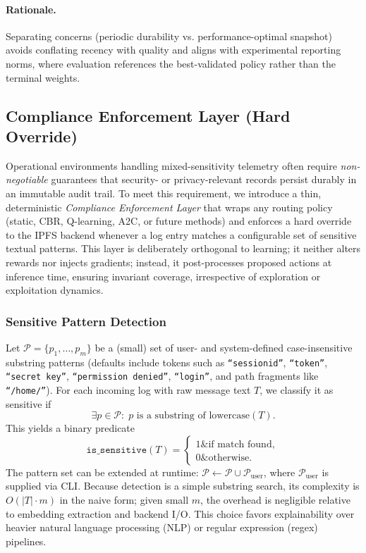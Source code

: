 \paragraph{Rationale.}
Separating concerns (periodic durability vs. performance-optimal snapshot) avoids conflating recency with quality and aligns with experimental reporting norms, where evaluation references the best-validated policy rather than the terminal weights.


\subsection{Compliance Enforcement Layer (Hard Override)}\label{s:compliance-layer}

Operational environments handling mixed-sensitivity telemetry often require \emph{non-negotiable} guarantees that security- or privacy-relevant records persist durably in an immutable audit trail. To meet this requirement, we introduce a thin, deterministic \emph{Compliance Enforcement Layer} that wraps any routing policy (static, CBR, Q-learning, A2C, or future methods) and enforces a hard override to the IPFS backend whenever a log entry matches a configurable set of sensitive textual patterns. This layer is deliberately orthogonal to learning; it neither alters rewards nor injects gradients; instead, it post-processes proposed actions at inference time, ensuring invariant coverage, irrespective of exploration or exploitation dynamics.

\subsubsection{Sensitive Pattern Detection}\label{s:compliance-pattern-detection}

Let $\mathcal{P} = \{p_1, \dots, p_m\}$ be a (small) set of user- and system-defined case-insensitive substring patterns (defaults include tokens such as \texttt{``sessionid''}, \texttt{``token''}, \texttt{``secret key''}, \texttt{``permission denied''}, \texttt{``login''}, and path fragments like \texttt{``/home/''}). For each incoming log with raw message text $T$, we classify it as sensitive if
\[
\exists p \in \mathcal{P}:\; p \text{ is a substring of } \text{lowercase}(T).
\]
This yields a binary predicate
\[
\texttt{is\_sensitive}(T) =
\begin{cases}
1\& \text{if match found},\\
0\& \text{otherwise}.
\end{cases}
\]
The pattern set can be extended at runtime: $\mathcal{P} \leftarrow \mathcal{P} \cup \mathcal{P}_{\text{user}}$, where $\mathcal{P}_{\text{user}}$ is supplied via CLI. Because detection is a simple substring search, its complexity is $O(|T| \cdot m)$ in the naive form; given small $m$, the overhead is negligible relative to embedding extraction and backend I/O. This choice favors explainability over heavier natural language processing (NLP) or regular expression (regex) pipelines.

